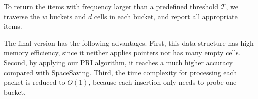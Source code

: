 
To return the items with frequency larger than a predefined threshold $\mathcal{T}$, we traverse the $w$ buckets and $d$ cells in each bucket, and report all appropriate items. 




The final version has the following advantages.
%
First, this data structure has high memory efficiency, since it neither applies pointers nor has many empty cells. Second, by applying our PRI algorithm, it reaches a much higher accuracy compared with SpaceSaving. 
Third, the time complexity for processing each packet is reduced to $O(1)$, because each insertion only needs to probe one bucket.
%


\begin{comment}
\begin{algorithm}
	\KwIn{An item $e_i$}
	$random()\in [0,1]$\\
	$b_i \gets b[h(e_i)\%w]$\;
	\eIf{$e_{i}\in b_i$}
	{
		$Interest(e_{i})++$\;
	}
	  {
        \eIf{$b_i$ has empty cells }
	        {
	        $b_i.insert(e_{i})$\;	
	        }
	   {
	       \eIf{$random() \leqslant \frac{1}{2*\iii_{min}-
t_{fail}+1}$}
              {
	           $e_{min} \gets e_i$\;
	           $\iii_{min} \gets \iii_{min} + \frac{t_{fail}}{\iii_{min}}$\;
	           $t_{fail} \gets 0$\;
	          }
	          {
	          $t_{fail}++$\;
	          }
	   }
	  }
	\caption{Insertion process for the final version.}
	\label{alg:mul}
\end{algorithm}

\end{comment}



